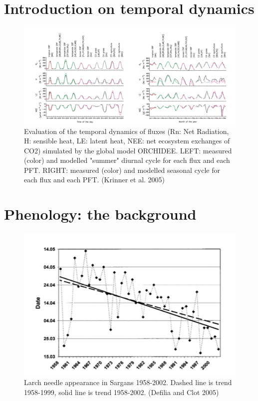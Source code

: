 \documentclass[12pt,oneside]{book}
\begin{document}

\section{Introduction on temporal
dynamics}\label{introduction-on-temporal-dynamics}

\begin{figure}

{\centering \includegraphics[width=0.8\linewidth]{figures/chap4/f41_Krinner} 

}

\caption{Evaluation of the temporal dynamics of fluxes (Rn: Net Radiation, H: sensible heat, LE: latent heat, NEE: net ecosystem exchanges of CO2) simulated by the global model ORCHIDEE. LEFT: measured (color) and modelled "summer" diurnal cycle for each flux and each PFT. RIGHT: measured (color) and modelled seasonal cycle for each flux and each PFT. (Krinner et al. 2005)}\label{fig:f41}
\end{figure}

\section{Phenology: the background}\label{phenology-the-background}

\begin{figure}

{\centering \includegraphics[width=0.8\linewidth]{figures/chap4/f42_Defilia} 

}

\caption{Larch needle appearance in Sargans 1958-2002. Dashed line is trend 1958-1999, solid line is trend 1958-2002.  (Defilia and Clot 2005)}\label{fig:f42}
\end{figure}
\end{document}

